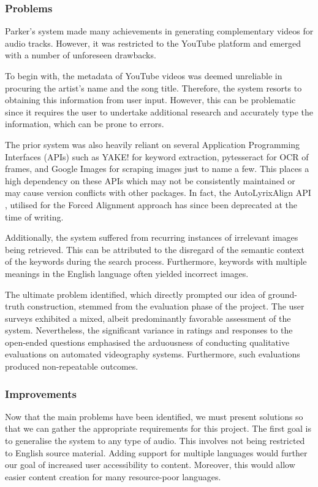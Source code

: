 \documentclass{l4proj}
\begin{document}
\subsubsection{Problems}
Parker's system made many achievements in generating complementary videos for audio tracks. However, it was restricted to the YouTube platform and emerged with a number of unforeseen drawbacks.

\label{par:metadata_problem}
To begin with, the metadata of YouTube videos was deemed unreliable in procuring the artist's name and the song title. Therefore, the system resorts to obtaining this information from user input. However, this can be problematic since it requires the user to undertake additional research and accurately type the information, which can be prone to errors. 

The prior system was also heavily reliant on several Application Programming Interfaces (APIs) such as YAKE! for keyword extraction, pytesseract \citep{pytesseract} for OCR of frames, and Google Images for scraping images just to name a few. This places a high dependency on these APIs which may not be consistently maintained or may cause version conflicts with other packages. In fact, the AutoLyrixAlign API \citep{gupta2020ala}, utilised for the Forced Alignment approach has since been deprecated at the time of writing.

Additionally, the system suffered from recurring instances of irrelevant images being retrieved. This can be attributed to the disregard of the semantic context of the keywords during the search process. Furthermore, keywords with multiple meanings in the English language often yielded incorrect images.

The ultimate problem identified, which directly prompted our idea of ground-truth construction, stemmed from the evaluation phase of the project. The user surveys exhibited a mixed, albeit predominantly favorable assessment of the system. Nevertheless, the significant variance in ratings and responses to the open-ended questions emphasised the arduousness of conducting qualitative evaluations on automated videography systems. Furthermore, such evaluations produced non-repeatable outcomes.

\subsubsection{Improvements}
Now that the main problems have been identified, we must present solutions so that we can gather the appropriate requirements for this project. The first goal is to generalise the system to any type of audio. This involves not being restricted to English source material. Adding support for multiple languages would further our goal of increased user accessibility to content. Moreover, this would allow easier content creation for many resource-poor languages.
\end{document}
